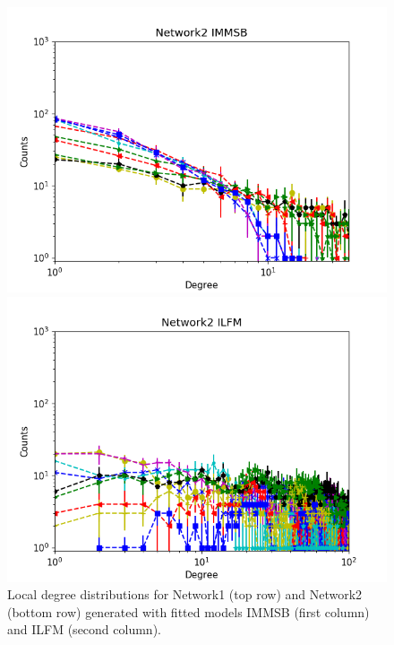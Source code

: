 \begin{figure}[h]
\begin{minipage}{0.24\textwidth}
        \includegraphics[width=\textwidth]{img/corpus/immsb_network2_1}
    \end{minipage}
    \begin{minipage}{0.24\textwidth}
        \includegraphics[width=\textwidth]{img/corpus/ilfm_network2_1}
    \end{minipage}
    \caption {Local degree distributions for Network1 (top row) and Network2 (bottom row) generated with fitted models IMMSB (first column) and ILFM (second column).} 
\label{fig:me_local}
\end{figure}

